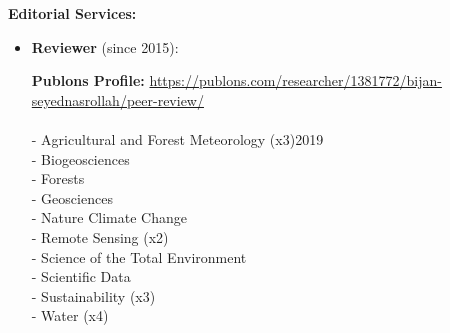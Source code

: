 \documentclass[10pt]{article}
\newenvironment{changemargin}[2]{%
  \begin{list}{}{%
 \setlength{\topsep}{0pt}%
 \setlength{\leftmargin}{#1}%
 \setlength{\rightmargin}{#2}%
 \setlength{\listparindent}{\parindent}%
 \setlength{\itemindent}{\parindent}%
 \setlength{\parsep}{\parskip}%
  }%
  \item[]}{\end{list}
}
\newenvironment{body} {
  \vspace*{-2pt}
  \begin{changemargin}{-0.5in}{-0.5in}
}
{\end{changemargin}
}
\begin{document}
\begin{body}
  \textbf{Editorial Services:} \\
  \vspace*{-4pt}
  \begin{itemize} \itemsep -0pt
    \item[] \textbf {Reviewer} (since 2015):
          \newline
          
          \hspace*{8pt} \textbf{Publons Profile: }\url{https://publons.com/researcher/1381772/bijan-seyednasrollah/peer-review/} \\

          \hspace*{8pt} \\
          \hspace*{8pt}  - Agricultural and Forest Meteorology (x3)\hfill {2019} \\
          \hspace*{8pt}  - Biogeosciences \\
          \hspace*{8pt}  - Forests \\
          \hspace*{8pt}  - Geosciences \\
          \hspace*{8pt}  - Nature Climate Change \\
          \hspace*{8pt}  - Remote Sensing (x2)\\
          \hspace*{8pt}  - Science of the Total Environment \\
          \hspace*{8pt}  - Scientific Data\\
          \hspace*{8pt}  - Sustainability (x3)\\
          \hspace*{8pt}  - Water (x4) \\
          \bigskip


\end{itemize}
\end{body}
\end{document}
